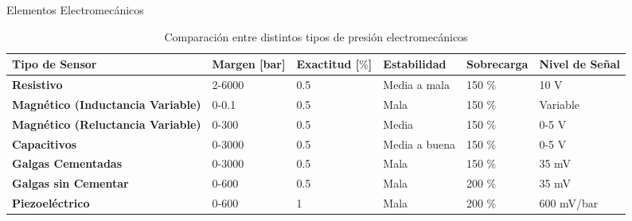 \documentclass[aspectratio=169]{beamer}
\begin{document}
\begin{frame}{Elementos Electromecánicos }
 \begin{table}[]
 \footnotesize
    \centering
    \begin{tabular}{m{3.2cm} m{1.2cm} m{1.2cm} m{2.2cm} m{1.6cm} m{1.5cm}}
        \toprule
        \textbf{Tipo de Sensor} & \textbf{Margen [bar]} & \textbf{Exactitud [$\%$]} &\textbf{Estabilidad} & \textbf{Sobrecarga} & \textbf{Nivel de Señal} \\
        \midrule
        \textbf{Resistivo} & 2-6000 & 0.5 & Media a mala & 150 \% & 10 V\\
        \textbf{Magnético (Inductancia Variable)} & 0-0.1 & 0.5 & Mala & 150 \% & Variable\\
        \textbf{Magnético (Reluctancia Variable)} & 0-300 & 0.5 & Media & 150 \% & 0-5 V\\
        \textbf{Capacitivos} & 0-3000 & 0.5 & Media a buena & 150 \% & 0-5  V\\
        \textbf{Galgas Cementadas} & 0-3000 & 0.5 & Mala & 150 \% & 35 mV\\
        \textbf{Galgas sin Cementar} & 0-600 & 0.5 & Mala & 200 \% & 35 mV\\
        \textbf{Piezoeléctrico} & 0-600 & 1 & Mala & 200 \% & 600 mV/bar\\
        \bottomrule
    \end{tabular}
    \caption{Comparación entre distintos tipos de presión electromecánicos}
    \label{tab:Comparacion}
\end{table}
\end{frame}
\end{document}
